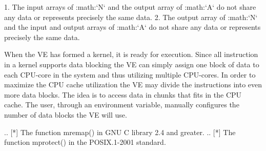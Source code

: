 1. The input arrays of :math:`N` and the output array of :math:`A` do not share any data or represents precisely the same data.
2. The output array of :math:`N` and the input and output arrays of :math:`A` do not share any data or represents precisely the same data.

When the VE has formed a kernel, it is ready for execution. Since all instruction in a kernel supports data blocking the VE can simply assign one block of data to each CPU-core in the system and thus utilizing multiple CPU-cores. In order to maximize the CPU cache utilization the VE may divide the instructions into even more data blocks. The idea is to access data in chunks that fits in the CPU cache. The user, through an environment variable, manually configures the number of data blocks the VE will use.

.. [*] The function mremap() in GNU C library 2.4 and greater.
.. [*] The function mprotect() in the POSIX.1-2001 standard.

